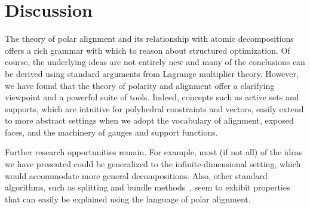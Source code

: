 \section{Discussion} \label{sec:conclusions}

The theory of polar alignment and its relationship with atomic decompositions
offers a rich grammar with which to reason about structured optimization. Of
course, the underlying ideas are not entirely new and many of the conclusions
can be derived using standard arguments from Lagrange multiplier theory.
However, we have found that the theory of polarity and alignment offer a
clarifying viewpoint and a powerful suite of tools. Indeed, concepts such as
active sets and supports, which are intuitive for polyhedral constraints and
vectors, easily extend to more abstract settings when we adopt the vocabulary of
alignment, exposed faces, and the machinery of gauges and support functions.

Further research opportunities remain. For example, most (if not all) of the
ideas we have presented could be generalized to the infinite-dimensional
setting, which would accommodate more general decompositions. Also, other
standard algorithms, such as splitting and bundle methods~\cite{fan2019bundle}, seem to exhibit properties that can easily be explained using the language of polar alignment.








